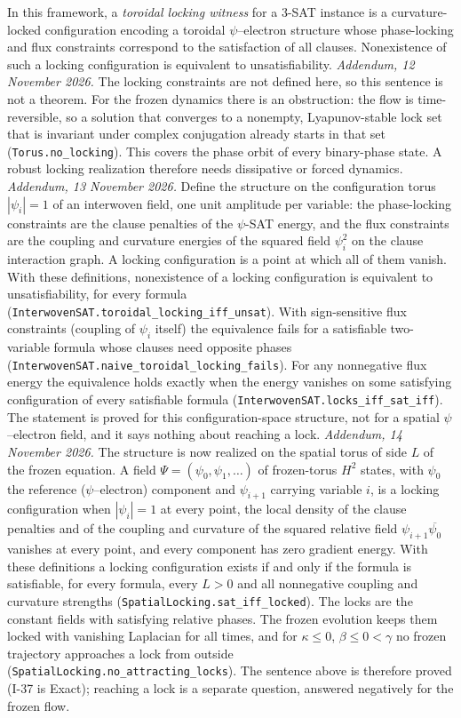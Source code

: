 \documentclass[12pt]{article}
\theoremstyle{remark}
\begin{document}
In this framework, a \emph{toroidal locking witness} for a
3-SAT instance is a curvature-locked configuration encoding a
toroidal $\psi$--electron structure whose phase-locking and flux
constraints correspond to the satisfaction of all clauses. Nonexistence
of such a locking configuration is equivalent to unsatisfiability.
\emph{Addendum, 12 November 2026.}  The locking constraints are not
defined here, so this sentence is not a theorem.  For the frozen
dynamics there is an obstruction: the flow is time-reversible, so a
solution that converges to a nonempty, Lyapunov-stable lock set that is
invariant under complex conjugation already starts in that set
(\nolinkurl{Torus.no_locking}).  This covers the phase orbit of every
binary-phase state.  A robust locking realization therefore needs
dissipative or forced dynamics.
\emph{Addendum, 13 November 2026.}  Define the structure on the
configuration torus $|\psi_i|=1$ of an interwoven field, one unit
amplitude per variable: the phase-locking constraints are the clause
penalties of the $\psi$-SAT energy, and the flux constraints are the
coupling and curvature energies of the squared field $\psi_i^2$ on the
clause interaction graph.  A locking configuration is a point at which
all of them vanish.  With these definitions, nonexistence of a locking
configuration is equivalent to unsatisfiability, for every formula
(\nolinkurl{InterwovenSAT.toroidal_locking_iff_unsat}).  With
sign-sensitive flux constraints (coupling of $\psi_i$ itself) the
equivalence fails for a satisfiable two-variable formula whose clauses
need opposite phases (\nolinkurl{InterwovenSAT.naive_toroidal_locking_fails}).
For any nonnegative flux energy the equivalence holds exactly when the
energy vanishes on some satisfying configuration of every satisfiable
formula (\nolinkurl{InterwovenSAT.locks_iff_sat_iff}).  The statement is
proved for this configuration-space structure, not for a spatial
$\psi$--electron field, and it says nothing about reaching a lock.
\emph{Addendum, 14 November 2026.}  The structure is now realized on the
spatial torus of side $L$ of the frozen equation.  A field
$\Psi=(\psi_0,\psi_1,\dots)$ of frozen-torus $H^2$ states, with $\psi_0$
the reference ($\psi$--electron) component and $\psi_{i+1}$ carrying
variable $i$, is a locking configuration when $|\psi_i|=1$ at every
point, the local density of the clause penalties and of the coupling
and curvature of the squared relative field
$\psi_{i+1}\overline{\psi_0}$ vanishes at every point, and every
component has zero gradient energy.  With these definitions a locking
configuration exists if and only if the formula is satisfiable, for
every formula, every $L>0$ and all nonnegative coupling and curvature
strengths (\nolinkurl{SpatialLocking.sat_iff_locked}).  The locks are
the constant fields with satisfying relative phases.  The frozen
evolution keeps them locked with vanishing Laplacian for all times, and
for $\kappa\le 0$, $\beta\le 0<\gamma$ no frozen trajectory approaches
a lock from outside (\nolinkurl{SpatialLocking.no_attracting_locks}).
The sentence above is therefore proved (I-37 is Exact); reaching a lock
is a separate question, answered negatively for the frozen flow.
\end{document}

